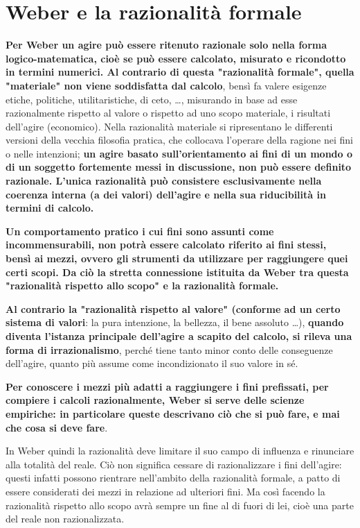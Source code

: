 \section{Weber e la razionalità formale}

\textbf{Per Weber un agire può essere ritenuto razionale solo nella forma logico-matematica, cioè se può essere calcolato, misurato e ricondotto in termini numerici. Al contrario di questa "razionalità formale", quella "materiale" non viene soddisfatta dal calcolo}, bensì fa valere esigenze etiche, politiche, utilitaristiche, di ceto, \dots, misurando in base ad esse razionalmente rispetto al valore o rispetto ad uno scopo materiale, i risultati dell'agire (economico). Nella razionalità materiale si ripresentano le differenti versioni della vecchia filosofia pratica, che collocava l'operare della ragione nei fini o nelle intenzioni; \textbf{un agire basato sull'orientamento ai fini di un mondo o di un soggetto fortemente messi in discussione, non può essere definito razionale. L'unica razionalità può consistere esclusivamente nella coerenza interna (a dei valori) dell'agire e nella sua riducibilità in termini di calcolo.}

\textbf{Un comportamento pratico i cui fini sono assunti come incommensurabili, non potrà essere calcolato riferito ai fini stessi, bensì ai mezzi, ovvero gli strumenti da utilizzare per raggiungere quei certi scopi. Da ciò la stretta connessione istituita da Weber tra questa "razionalità rispetto allo scopo" e la razionalità formale.}

\textbf{Al contrario la "razionalità rispetto al valore" (conforme ad un certo sistema di valori}: la pura intenzione, la bellezza, il bene assoluto \dots), \textbf{quando diventa l'istanza principale dell'agire a scapito del calcolo, si rileva una forma di irrazionalismo}, perché tiene tanto minor conto delle conseguenze dell'agire, quanto più assume come incondizionato il suo valore in sé.

\textbf{Per conoscere i mezzi più adatti a raggiungere i fini prefissati, per compiere i calcoli razionalmente, Weber si serve delle scienze empiriche: in particolare queste descrivano ciò che si può fare, e mai che cosa si deve fare}.

In Weber quindi la razionalità deve limitare il suo campo di influenza e rinunciare alla totalità del reale. Ciò non significa cessare di razionalizzare i fini dell'agire: questi infatti possono rientrare nell'ambito della razionalità formale, a patto di essere considerati dei mezzi in relazione ad ulteriori fini. Ma così facendo la razionalità rispetto allo scopo avrà sempre un fine al di fuori di lei, cioè una parte del reale non razionalizzata.


